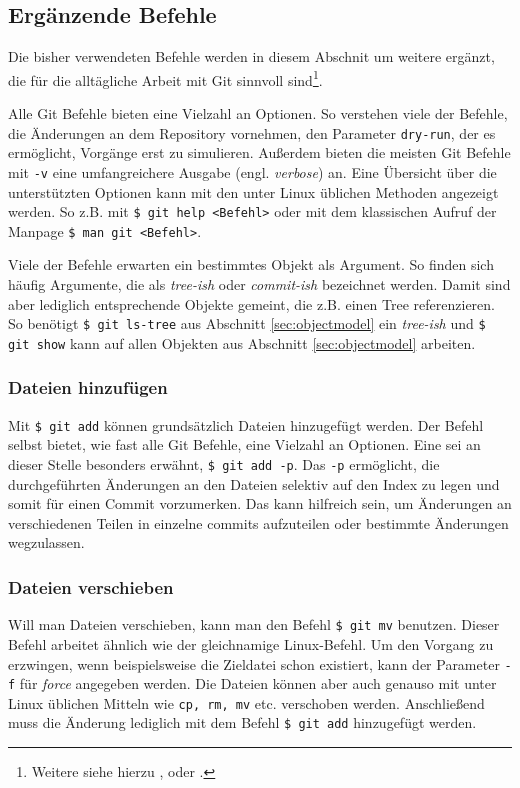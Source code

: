 \subsection{Ergänzende Befehle}\label{sec:commands}
Die bisher verwendeten Befehle werden in diesem Abschnit um weitere ergänzt,
die für die alltägliche Arbeit mit Git sinnvoll sind\footnote{Weitere siehe
hierzu \cite{gitosp}, \cite{progit} oder \cite{gitwf}.}.

Alle Git Befehle bieten eine Vielzahl an Optionen. So verstehen viele der
Befehle, die Änderungen an dem Repository vornehmen, den Parameter
\texttt{\-{}\-{}dry-run}, der es ermöglicht, Vorgänge erst zu simulieren.
Außerdem bieten die meisten Git Befehle mit \texttt{-v} eine umfangreichere
Ausgabe (engl. \textit{verbose}) an. Eine Übersicht über die unterstützten
Optionen kann mit den unter Linux üblichen Methoden angezeigt werden. So z.B.
mit \texttt{\$ git help <Befehl>} oder mit dem klassischen Aufruf der Manpage
\texttt{\$ man git <Befehl>}.

Viele der Befehle erwarten ein bestimmtes Objekt als Argument. So finden sich
häufig Argumente, die als \textit{tree-ish} oder \textit{commit-ish} bezeichnet
werden. Damit sind aber lediglich entsprechende Objekte gemeint, die z.B. einen
Tree referenzieren. So benötigt \texttt{\$ git ls-tree} aus Abschnitt
\ref{sec:objectmodel} ein \textit{tree-ish} und \texttt{\$ git show} kann auf
allen Objekten aus Abschnitt \ref{sec:objectmodel} arbeiten. \cite[52]{gitosp}

\subsubsection{Dateien hinzufügen}\label{sec:gitadd}
Mit \texttt{\$ git add} können grundsätzlich Dateien hinzugefügt werden. Der
Befehl selbst bietet, wie fast alle Git Befehle, eine Vielzahl an Optionen.
Eine sei an dieser Stelle besonders erwähnt, \texttt{\$ git add -p}. Das
\texttt{-p} ermöglicht, die durchgeführten Änderungen an den Dateien selektiv
auf den Index zu legen und somit für einen Commit vorzumerken. Das kann
hilfreich sein, um Änderungen an verschiedenen Teilen in einzelne
\glspl{commit} aufzuteilen oder bestimmte Änderungen
wegzulassen. \cite[S.~36-37]{gitosp}

\subsubsection{Dateien verschieben} Will man Dateien verschieben, kann man den
Befehl \texttt{\$ git mv} benutzen. Dieser Befehl arbeitet ähnlich wie der
gleichnamige Linux-Befehl. Um den Vorgang zu erzwingen, wenn beispielsweise
die Zieldatei schon existiert, kann der Parameter \texttt{-f} für
\textit{force} angegeben werden. Die Dateien können aber auch genauso mit unter
Linux üblichen Mitteln wie \texttt{cp, rm, mv} etc. verschoben werden.
Anschließend muss die Änderung lediglich mit dem Befehl \texttt{\$ git add}
hinzugefügt werden.\cite[S.~43-44]{gitosp}

